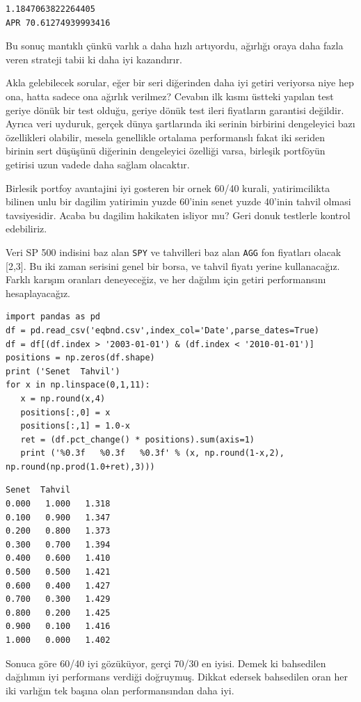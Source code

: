 \documentclass[12pt,fleqn]{article}\usepackage{../../common}
\begin{document}
\begin{verbatim}
1.1847063822264405
APR 70.61274939993416
\end{verbatim}

Bu sonuç mantıklı çünkü varlık a daha hızlı artıyordu, ağırlığı oraya daha fazla
veren strateji tabii ki daha iyi kazandırır.

Akla gelebilecek sorular, eğer bir seri diğerinden daha iyi getiri veriyorsa
niye hep ona, hatta sadece ona ağırlık verilmez? Cevabın ilk kısmı üstteki
yapılan test geriye dönük bir test olduğu, geriye dönük test ileri fiyatların
garantisi değildir. Ayrıca veri uyduruk, gerçek dünya şartlarında iki serinin
birbirini dengeleyici bazı özellikleri olabilir, mesela genellikle ortalama
performanslı fakat iki seriden birinin sert düşüşünü diğerinin dengeleyici
özelliği varsa, birleşik portföyün getirisi uzun vadede daha sağlam olacaktır.

Birlesik portfoy avantajini iyi gosteren bir ornek 60/40 kurali, yatirimcilikta
bilinen unlu bir dagilim yatirimin yuzde 60'inin senet yuzde 40'inin tahvil
olmasi tavsiyesidir. Acaba bu dagilim hakikaten isliyor mu? Geri donuk testlerle
kontrol edebiliriz. 

Veri SP 500 indisini baz alan \verb!SPY! ve tahvilleri baz alan \verb!AGG! fon
fiyatları olacak [2,3]. Bu iki zaman serisini genel bir borsa, ve tahvil fiyatı
yerine kullanacağız. Farklı karışım oranları deneyeceğiz, ve her dağılım için
getiri performansını hesaplayacağız.

\begin{verbatim}
import pandas as pd
df = pd.read_csv('eqbnd.csv',index_col='Date',parse_dates=True)
df = df[(df.index > '2003-01-01') & (df.index < '2010-01-01')]
positions = np.zeros(df.shape)
print ('Senet  Tahvil')
for x in np.linspace(0,1,11):
   x = np.round(x,4)
   positions[:,0] = x
   positions[:,1] = 1.0-x
   ret = (df.pct_change() * positions).sum(axis=1)
   print ('%0.3f   %0.3f   %0.3f' % (x, np.round(1-x,2), np.round(np.prod(1.0+ret),3)))
\end{verbatim}

\begin{verbatim}
Senet  Tahvil
0.000   1.000   1.318
0.100   0.900   1.347
0.200   0.800   1.373
0.300   0.700   1.394
0.400   0.600   1.410
0.500   0.500   1.421
0.600   0.400   1.427
0.700   0.300   1.429
0.800   0.200   1.425
0.900   0.100   1.416
1.000   0.000   1.402
\end{verbatim}

Sonuca göre 60/40 iyi gözüküyor, gerçi 70/30 en iyisi. Demek ki bahsedilen
dağılımın iyi performans verdiği doğruymuş. Dikkat edersek bahsedilen oran
her iki varlığın tek başına olan performansından daha iyi. 
\end{document}
